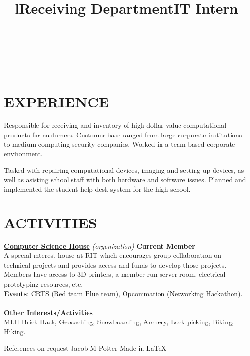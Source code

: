 \documentclass[line,margin]{res}
\begin{document}
\begin{resume}
\begin{format}
\title{l}\\
\\
\body\\
\end{format}
\section{EXPERIENCE}
\title{\textbf{Receiving Department}}
\begin{position}
    Responsible for receiving and inventory of high dollar value 
    computational products for customers. Customer base ranged from large 
    corporate institutions to medium computing security companies. Worked in a
    team based corporate environment.
\end{position}
\title{\textbf{IT Intern}}
\begin{position}
    Tasked with repairing computational devices, imaging and setting up devices, 
    as well as asisting school staff with both hardware and software issues. 
    Planned and implemented the student help desk system for the high 
    school.
\end{position}

\section{ACTIVITIES}
\href{https://csh.rit.edu}{\textbf{Computer Science House}}
{\sl (organization)}\hfill
\textbf{Current Member}\\
A special interest house at RIT which encourages group collaboration on technical 
projects and provides access and funds to develop those projects. Members have 
access to 3D printers, a member run server room, electrical prototyping 
resources, etc.\\
\textbf{Events}: 
CRTS (Red team Blue team), Opcommation (Networking Hackathon).\\\\
\textbf{Other Interests/Activities}\\
MLH Brick Hack, Geocaching, Snowboarding, Archery, Lock picking, Biking, Hiking.

\end{resume}

\scriptsize{References on request} \hfill 
\scriptsize{Jacob M Potter} \hfill 
\scriptsize{Made in \LaTeX}
\end{document}
